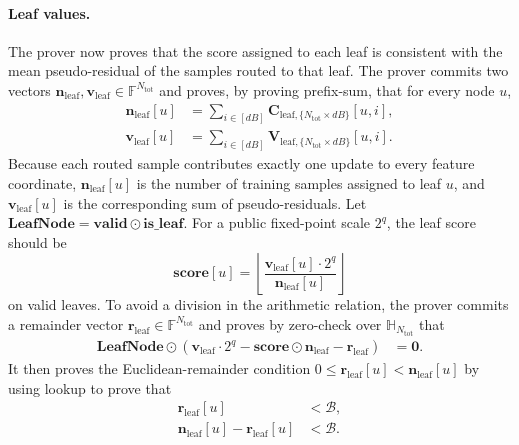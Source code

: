 \paragraph{Leaf values.}
The prover now proves that the score
assigned to each leaf is consistent with the mean pseudo-residual of the samples routed to that leaf.
The prover
commits two vectors
$\mathbf{n}_{\mathrm{leaf}},\mathbf{v}_{\mathrm{leaf}}
\in\mathbb{F}^{N_{\mathrm{tot}}}$ and proves, by proving prefix-sum, that for every node $u$,
\begin{align}
    \mathbf{n}_{\mathrm{leaf}}[u]
    &=
    \sum_{i\in [dB]}\mathbf{C}_{\mathrm{leaf}, \{N_{\mathrm{tot}}\times dB\}}[u,i],\\
    \mathbf{v}_{\mathrm{leaf}}[u]
    &=
    \sum_{i\in [dB]}\mathbf{V}_{\mathrm{leaf}, \{N_{\mathrm{tot}}\times dB\}}[u,i].
\end{align}
Because each routed sample contributes exactly one update to every feature
coordinate, $\mathbf{n}_{\mathrm{leaf}}[u]$ is the number of training samples
assigned to leaf $u$, and $\mathbf{v}_{\mathrm{leaf}}[u]$ is the corresponding
sum of pseudo-residuals. Let
$\mathbf{LeafNode}=\mathbf{valid}\odot\mathbf{is\_leaf}$.
For a public fixed-point scale $2^q$, the leaf score should be
\[
    \mathbf{score}[u]
    =
    \left\lfloor
    \frac{\mathbf{v}_{\mathrm{leaf}}[u]\cdot 2^q}
    {\mathbf{n}_{\mathrm{leaf}}[u]}
    \right\rfloor
\]
on valid leaves. To avoid a division in the arithmetic relation, the prover
commits a remainder vector
$\mathbf{r}_{\mathrm{leaf}}\in\mathbb{F}^{N_{\mathrm{tot}}}$ and proves by
zero-check over $\mathbb{H}_{N_{\mathrm{tot}}}$ that
\begin{align}
    \mathbf{LeafNode}\odot
    \left(
    \mathbf{v}_{\mathrm{leaf}}\cdot 2^q
    -\mathbf{score}\odot\mathbf{n}_{\mathrm{leaf}}
    -\mathbf{r}_{\mathrm{leaf}}
    \right)
    &=\mathbf{0}.
\end{align}
It then proves the Euclidean-remainder condition
$0\leq\mathbf{r}_{\mathrm{leaf}}[u]<\mathbf{n}_{\mathrm{leaf}}[u]$
by using lookup to prove that
\begin{align}
    \mathbf{r}_{\mathrm{leaf}}[u] &< \mathcal{B},\\
    \mathbf{n}_{\mathrm{leaf}}[u] - \mathbf{r}_{\mathrm{leaf}}[u] &< \mathcal{B}.
\end{align}

